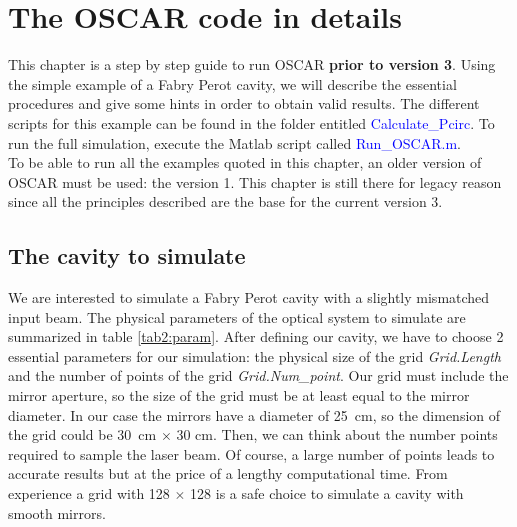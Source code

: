 \chapter{The OSCAR code in details}
\label{chap2}

This chapter is a step by step guide to run OSCAR \textbf{prior to version 3}. Using the simple example of a Fabry Perot cavity, we will describe the essential procedures and give some hints in order to obtain valid results. The different scripts for this example can be found in the folder entitled \textcolor{blue}{Calculate\_Pcirc}. To run the full simulation, execute the Matlab script called \textcolor{blue}{Run\_OSCAR.m}.\\

To be able to run all the examples quoted in this chapter, an older version of OSCAR must be used: the version 1. This chapter is still there for legacy reason since all the principles described are the base for the current version 3.


\section{The cavity to simulate}
\label{chap2:1}
We are interested to simulate a Fabry Perot cavity with a slightly mismatched input beam. The physical parameters of the optical system to simulate are summarized in table \ref{tab2:param}. After defining our cavity, we have to choose 2 essential parameters for our simulation: the physical size of the grid \textsl{Grid.Length} and the number of points of the grid \textsl{Grid.Num\_point}. Our grid must include the mirror aperture, so the size of the grid must be at least equal to the mirror diameter. In our case the mirrors have a diameter of 25~cm, so the dimension of the grid could be 30~cm $\times$ 30 cm. Then, we can think about the number points required to sample the laser beam. Of course, a large number of points leads to accurate results but at the price of a lengthy computational time. From experience a grid with 128 $\times$ 128 is a safe choice to simulate a cavity with smooth mirrors.

